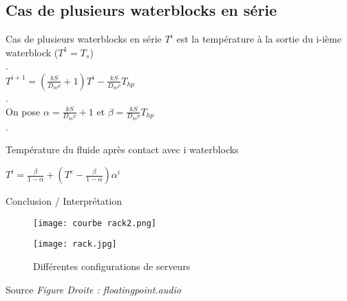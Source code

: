 \documentclass[hyperref={pdfpagelabels=false}]{beamer}
\begin{document}
\subsection*{Cas de plusieurs waterblocks en série}\label{e16}
\begin{frame}{Cas de plusieurs waterblocks en série}
$T^i$ est la température à la sortie du i-ième waterblock  ($T^1 = T_s$)\\
{\color{white}.}\\
$T^{i+1} = (\frac{kS}{D_m c} + 1) T^i - \frac{kS}{D_m c} T_{hp}$  \\
{\color{white}.}\\
On pose $\alpha = \frac{kS}{D_m c} + 1$ et $\beta = \frac{kS}{D_m c} T_{hp}$ \\
{\color{white}.} \\
\begin{exampleblock}{Température du fluide après contact avec i waterblocks}
\begin{center} $T^i = \frac{\beta}{1-\alpha} +  (T^e - \frac{\beta}{1-\alpha} ) {\alpha}^i$ \end{center} \end{exampleblock}
\end{frame}



\begin{frame}{Conclusion / Interprétation {\textcolor{ultramarine}{\hyperlink{a53}{}}} }
\begin{figure}[!htb]
  \begin{minipage}[b]{0.45\linewidth}
    \centering
    \texttt{[image: courbe rack2.png]}
    \caption{Température en fonction du nombre de waterblocks ($T_{sc} = 74$°C)}
    \begin{center}
    \label{fig:label-1}
    \end{center}
  \end{minipage}
  \hfill
  \begin{minipage}[b]{0.45\linewidth}
    \centering
    \texttt{[image: rack.jpg]}
    \caption{Différentes configurations de serveurs}
    \label{fig:label-2}
  \end{minipage}
\end{figure}
\hfill{\footnotesize Source \textit{Figure Droite : floatingpoint.audio} }
\end{frame}
\end{document}
